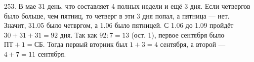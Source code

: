 253. В мае 31 день, что составляет 4 полных недели и ещё 3 дня. Если четвергов было больше, чем пятниц, то четверг в эти 3 дня попал, а пятница --- нет. Значит, 31.05 было четвргом, а 1.06 было пятницей. С 1.06 до 1.09 пройдёт $30+31+31=92$ дня. Так как $92:7=13$ (ост. 1), первое сентября было $\text{ПТ}+1=\text{СБ}.$ Тогда первый вторник был $1+3=4$ сентября, а второй --- $4+7=11$ сентября.\\
